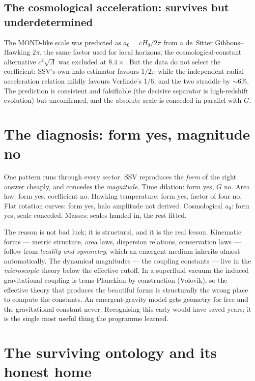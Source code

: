 \documentclass[11pt]{article}
\begin{document}
\subsection{The cosmological acceleration: survives but underdetermined}

The MOND-like scale was predicted as $a_0=cH_0/2\pi$ from a de~Sitter
Gibbons--Hawking $2\pi$, the same factor used for local horizons; the
cosmological-constant alternative $c^2\sqrt\Lambda$ was excluded at $8.4\times$.
But the data do not select the coefficient: SSV's own halo estimator favours
$1/2\pi$ while the independent radial-acceleration relation mildly favours
Verlinde's $1/6$, and the two straddle by $\sim$6\%. The prediction is consistent
and falsifiable (the decisive separator is high-redshift evolution) but
unconfirmed, and the absolute scale is conceded in parallel with $G$.

\section{The diagnosis: form yes, magnitude no}

One pattern runs through every sector. SSV reproduces the \emph{form} of the right
answer cheaply, and concedes the \emph{magnitude}. Time dilation: form yes, $G$
no. Area law: form yes, coefficient no. Hawking temperature: form yes, factor of
four no. Flat rotation curves: form yes, halo amplitude not derived.
Cosmological $a_0$: form yes, scale conceded. Masses: scales handed in, the rest
fitted.

The reason is not bad luck; it is structural, and it is the real lesson. Kinematic
forms --- metric structure, area laws, dispersion relations, conservation laws ---
follow from \emph{locality and symmetry}, which an emergent medium inherits almost
automatically. The dynamical magnitudes --- the coupling constants --- live in the
\emph{microscopic} theory below the effective cutoff. In a superfluid vacuum the
induced gravitational coupling is trans-Planckian by construction (Volovik), so
the effective theory that produces the beautiful forms is structurally the wrong
place to compute the constants. An emergent-gravity model gets geometry for free
and the gravitational constant never. Recognising this early would have saved
years; it is the single most useful thing the programme learned.

\section{The surviving ontology and its honest home}
\end{document}
